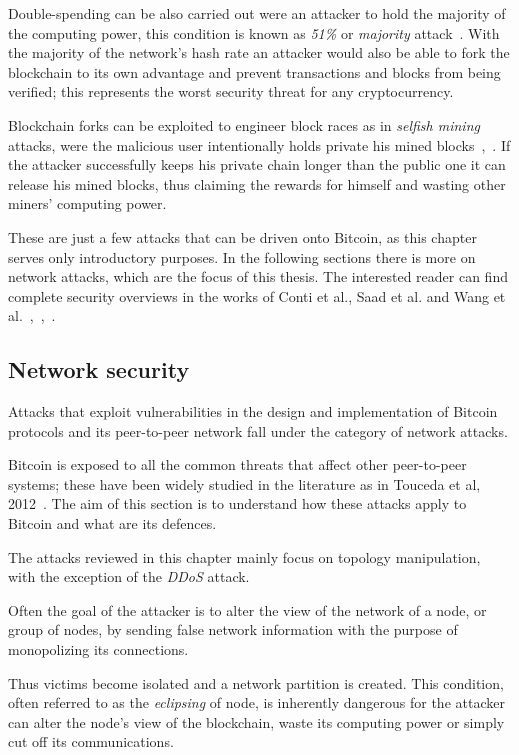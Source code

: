 \documentclass[12pt, letterpaper, twoside]{article}
\begin{document}
Double-spending can be also carried out were an attacker to hold the majority of the computing power, this condition is known as \textit{51\%} or \textit{majority} attack~\cite{51atk}. With the majority of the network's hash rate an attacker would also be able to fork the blockchain to its own advantage and prevent transactions and blocks from being verified; this represents the worst security threat for any cryptocurrency.

Blockchain forks can be exploited to engineer block races as in \textit{selfish mining} attacks, were the malicious user intentionally holds private his mined blocks~\cite{selfishmining},~\cite{leelavimolsilp2018selfish}. If the attacker successfully keeps his private chain longer than the public one it can release his mined blocks, thus claiming the rewards for himself and wasting other miners' computing power.

These are just a few attacks that can be driven onto Bitcoin, as this chapter serves only introductory purposes. In the following sections there is more on network attacks, which are the focus of this thesis. The interested reader can find complete security overviews in the works of Conti et al., Saad et al. and Wang et al.~\cite{completeattacksurvey},~\cite{saad2019attacksurface},~\cite{secpermissionlessblock}.

\subsection{Network security}\label{sec:netsec}
Attacks that exploit vulnerabilities in the design and implementation of Bitcoin protocols and its peer-to-peer network fall under the category of network attacks.

Bitcoin is exposed to all the common threats that affect other peer-to-peer systems; these have been widely studied in the literature as in Touceda et al, 2012~\cite{toucedafakeboot}. The aim of this section is to understand how these attacks apply to Bitcoin and what are its defences.

The attacks reviewed in this chapter mainly focus on topology manipulation, with the exception of the \emph{DDoS} attack.

Often the goal of the attacker is to alter the view of the network of a node, or group of nodes, by sending false network information with the purpose of monopolizing its connections.

Thus victims become isolated and a network partition is created. This condition, often referred to as the \textit{eclipsing} of node, is inherently dangerous for the attacker can alter the node's view of the blockchain, waste its computing power or simply cut off its communications.
\end{document}
